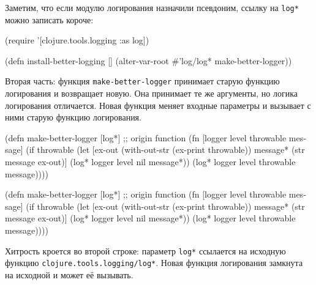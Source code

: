 Заметим, что если модулю логирования назначили псевдоним, ссылку на \verb|log*|
можно записать короче:



\begin{english}
  \begin{clojure}
(require '[clojure.tools.logging :as log])

(defn install-better-logging []
  (alter-var-root #'log/log* make-better-logger))
  \end{clojure}
\end{english}

Вторая часть: функция \texttt{make-better-logger} принимает старую функцию
логирования и возвращает новую. Она принимает те же аргументы, но логика
логирования отличается. Новая функция меняет входные параметры и вызывает с ними
старую функцию логирования.

\ifnarrow


\begin{english}
  \begin{clojure/lines}
(defn make-better-logger
  [log*] ;; origin function
  (fn [logger level throwable message]
    (if throwable
      (let [ex-out (with-out-str (ex-print throwable))
            message* (str message \newline ex-out)]
        (log* logger level nil message*))
      (log* logger level throwable message))))
  \end{clojure/lines}
\end{english}

\else

\begin{english}
  \begin{clojure/lines}
(defn make-better-logger
  [log*] ;; origin function
  (fn [logger level throwable message]
    (if throwable
      (let [ex-out (with-out-str (ex-print throwable))
            message* (str message \newline ex-out)]
        (log* logger level nil message*))
      (log* logger level throwable message))))
  \end{clojure/lines}
\end{english}

\fi

Хитрость кроется во второй строке: параметр \verb|log*| ссылается на исходную
функцию \verb|clojure.tools.logging/log*|. Новая функция логирования замкнута на
исходной и может её вызывать.

